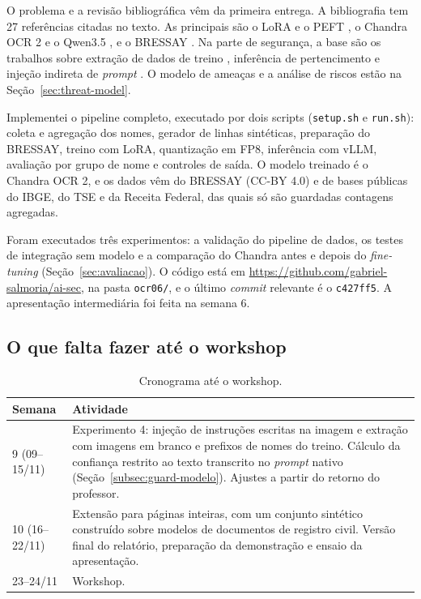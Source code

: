 \documentclass[12pt,a4paper]{article}
\newcommand{\ultimocommit}{c427ff5}
\begin{document}
O problema e a revisão bibliográfica vêm da primeira entrega. A bibliografia tem 27 referências citadas no texto. As principais são o LoRA \cite{lora2022} e o PEFT \cite{peft2022}, o Chandra OCR 2 \cite{chandra2026} e o Qwen3.5 \cite{qwen35}, e o BRESSAY \cite{bressay2023}. Na parte de segurança, a base são os trabalhos sobre extração de dados de treino \cite{carlini2021extracting}, inferência de pertencimento \cite{shokri2017membership} e injeção indireta de \emph{prompt} \cite{greshake2023indirect}. O modelo de ameaças e a análise de riscos estão na Seção~\ref{sec:threat-model}.

Implementei o pipeline completo, executado por dois scripts (\texttt{setup.sh} e \texttt{run.sh}): coleta e agregação dos nomes, gerador de linhas sintéticas, preparação do BRESSAY, treino com LoRA, quantização em FP8, inferência com vLLM, avaliação por grupo de nome e controles de saída. O modelo treinado é o Chandra OCR 2, e os dados vêm do BRESSAY (CC-BY 4.0) e de bases públicas do IBGE, do TSE e da Receita Federal, das quais só são guardadas contagens agregadas.

Foram executados três experimentos: a validação do pipeline de dados, os testes de integração sem modelo e a comparação do Chandra antes e depois do \emph{fine-tuning} (Seção~\ref{sec:avaliacao}). O código está em \url{https://github.com/gabriel-salmoria/ai-sec}, na pasta \texttt{ocr06/}, e o último \emph{commit} relevante é o \texttt{\ultimocommit}. A apresentação intermediária foi feita na semana 6.

\subsection*{O que falta fazer até o workshop}

\begin{table}[H]
\centering
\small
\begin{tabular}{@{}lp{11.5cm}@{}}
\toprule
Semana & Atividade \\
\midrule
9 (09--15/11) & Experimento 4: injeção de instruções escritas na imagem e extração com imagens em branco e prefixos de nomes do treino. Cálculo da confiança restrito ao texto transcrito no \emph{prompt} nativo (Seção~\ref{subsec:guard-modelo}). Ajustes a partir do retorno do professor. \\
10 (16--22/11) & Extensão para páginas inteiras, com um conjunto sintético construído sobre modelos de documentos de registro civil. Versão final do relatório, preparação da demonstração e ensaio da apresentação. \\
23--24/11 & Workshop. \\
\bottomrule
\end{tabular}
\caption{Cronograma até o workshop.}
\label{tab:cronograma-workshop}
\end{table}
\end{document}
